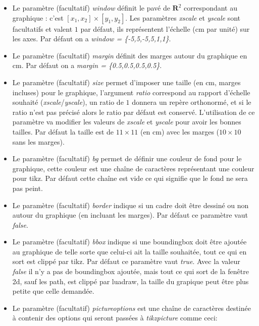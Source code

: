 \begin{itemize}
 \item Le paramètre (facultatif) \emph{window} définit le pavé de $\mathbf R^2$ correspondant au graphique : c'est $[x_1,x_2]\times[y_1,y_2]$. Les paramètres \emph{xscale} et \emph{yscale} sont facultatifs et valent $1$ par défaut, ils représentent l'échelle (cm par unité) sur les axes. Par défaut on a \emph{window = \{-5,5,-5,5,1,1\}}.
 
\item Le paramètre (facultatif) \emph{margin} définit des marges autour du graphique en cm. Par défaut on a \emph{margin = \{0.5,0.5,0.5,0.5\}}.

\item Le paramètre (facultatif) \emph{size} permet d'imposer une taille (en cm, marges incluses) pour le graphique, l'argument \emph{ratio} correspond au rapport d'échelle souhaité (\emph{xscale}/\emph{yscale}), un ratio de $1$ donnera un repère orthonormé, et si le ratio n'est pas précisé alors le ratio par défaut est conservé. L'utilisation de ce paramètre va modifier les valeurs de \emph{xscale} et \emph{yscale} pour avoir les bonnes tailles. Par défaut la taille est de $11\times11$ (en cm) avec les marges ($10\times10$ sans les marges).

\item Le paramètre (facultatif) \emph{bg} permet de définir une couleur de fond pour le graphique, cette couleur est une chaîne de caractères représentant une couleur pour tikz. Par défaut cette chaîne est vide ce qui signifie que le fond ne sera pas peint.

\item Le paramètre (facultatif) \emph{border} indique si un cadre doit être dessiné ou non autour du graphique (en incluant les marges). Par défaut ce paramètre vaut \emph{false}.

\item Le paramètre (facultatif) \emph{bbox} indique si une boundingbox doit être ajoutée au graphique de telle sorte que celui-ci ait la taille souhaitée, tout ce qui en sort est clippé par tikz. Par défaut ce paramètre vaut \emph{true}. Avec la valeur \emph{false} il n'y a pas de boundingbox ajoutée, mais tout ce qui sort de la fenêtre 2d, sauf les path, est clippé par luadraw, la taille du grapique peut être plus petite que celle demandée.

\item Le paramètre (facultatif) \emph{pictureoptions} est une chaîne de caractères destinée à contenir des options qui seront passées à \emph{tikzpicture} comme ceci:
\begin{TeXcode}
\begin{tikzpicture}[line join=round <,pictureoptions>]
\end{TeXcode}
\end{itemize}


